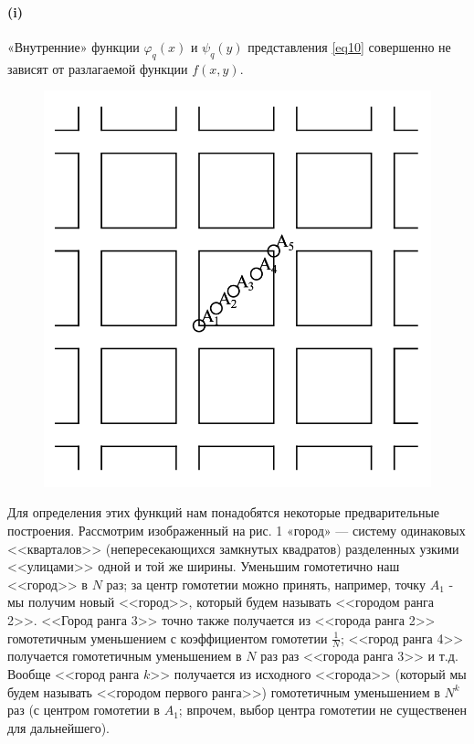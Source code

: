\documentclass[12pt, twoside]{article}
\theoremstyle{definition}
\begin{document}
\paragraph{(i)} «Внутренние» функции $\varphi_q(x)$ и $\psi_{q}(y)$ представления \eqref{eq10} совершенно не зависят от разлагаемой функции $f(x,y)$.
\begin{figure}[ht!]
  \centering\includegraphics[scale=0.6]{kvartal.png}
  \label{fig:boat5}
\end{figure}
Для определения этих функций нам понадобятся некоторые предварительные построения. Рассмотрим изображенный на рис. 1 «город» — систему одинаковых <<кварталов>> (непересекающихся замкнутых квадратов) разделенных узкими <<улицами>> одной и той же ширины. Уменьшим гомотетично наш <<город>> в $N$ раз; за центр гомотетии можно принять, например, точку $A_1$ - мы получим новый <<город>>, который будем называть <<городом ранга 2>>. <<Город ранга 3>> точно также получается из <<города ранга 2>> гомотетичным уменьшением с коэффициентом гомотетии $\frac{1}{N}$; <<город ранга 4>> получается гомотетичным уменьшением в $N$ раз раз <<города ранга 3>> и т.д. Вообще <<город ранга $k$>> получается из исходного <<города>> (который мы будем называть <<городом первого ранга>>) гомотетичным уменьшением в $N^k$ раз (с центром гомотетии в $A_1$; впрочем, выбор центра гомотетии не существенен для дальнейшего).
\end{document}
